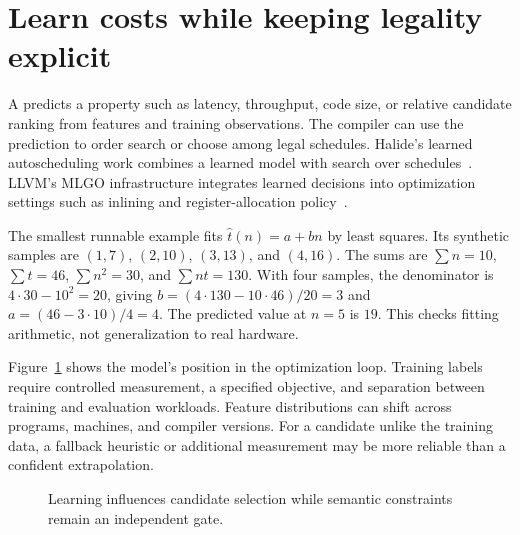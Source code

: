 \section{Learn costs while keeping legality explicit}
\label{sec:ch68-learning}

A  predicts a property such as latency, throughput, code size, or relative candidate ranking from features and training observations.
The compiler can use the prediction to order search or choose among legal schedules.
Halide's learned autoscheduling work combines a learned model with search over schedules~\cite{adams-2019-learning}.
LLVM's MLGO infrastructure integrates learned decisions into optimization settings such as inlining and register-allocation policy~\cite{llvm-2026-mlgo}.

The smallest runnable example fits $\widehat{t}(n)=a+bn$ by least squares.
Its synthetic samples are $(1,7)$, $(2,10)$, $(3,13)$, and $(4,16)$.
The sums are $\sum n=10$, $\sum t=46$, $\sum n^2=30$, and $\sum nt=130$.
With four samples, the denominator is $4\cdot30-10^2=20$, giving $b=(4\cdot130-10\cdot46)/20=3$ and $a=(46-3\cdot10)/4=4$.
The predicted value at $n=5$ is $19$.
This checks fitting arithmetic, not generalization to real hardware.

Figure~\ref{fig:ch68-learning} shows the model's position in the optimization loop.
Training labels require controlled measurement, a specified objective, and separation between training and evaluation workloads.
Feature distributions can shift across programs, machines, and compiler versions.
For a candidate unlike the training data, a fallback heuristic or additional measurement may be more reliable than a confident extrapolation.

\begin{figure}[htbp]
\centering
{}
\caption{Learning influences candidate selection while semantic constraints remain an independent gate.}
\label{fig:ch68-learning}
\end{figure}


